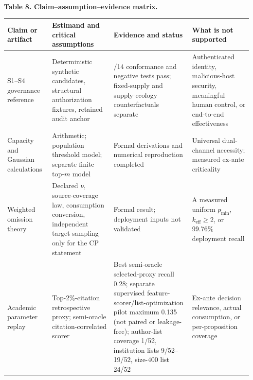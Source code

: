 \documentclass[
  11pt]{article}
\begin{document}
\textbf{Table 8. Claim--assumption--evidence matrix.}

\begin{longtable}[]{@{}
  >{\raggedright\arraybackslash}p{}
  >{\raggedright\arraybackslash}p{}
  >{\raggedright\arraybackslash}p{}
  >{\raggedright\arraybackslash}p{}@{}}
\toprule\noalign{}
\begin{minipage}[b]{\linewidth}\raggedright
Claim or artifact
\end{minipage} & \begin{minipage}[b]{\linewidth}\raggedright
Estimand and critical assumptions
\end{minipage} & \begin{minipage}[b]{\linewidth}\raggedright
Evidence and status
\end{minipage} & \begin{minipage}[b]{\linewidth}\raggedright
What is not supported
\end{minipage} \\
\midrule\noalign{}
\endhead
\bottomrule\noalign{}
\endlastfoot
S1--S4 governance reference & Deterministic synthetic candidates,
structural authorization fixtures, retained audit anchor & 14/14
conformance and negative tests pass; fixed-supply and supply-ecology
counterfactuals separate & Authenticated identity, malicious-host
security, meaningful human control, or end-to-end effectiveness \\
Capacity and Gaussian calculations & Arithmetic; population threshold
model; separate finite top-\(m\) model & Formal derivations and
numerical reproduction completed & Universal dual-channel necessity;
measured ex-ante criticality \\
Weighted omission theory & Declared \(\nu\), source-coverage law,
consumption conversion, independent target sampling only for the CP
statement & Formal result; deployment inputs not validated & A measured
uniform \(p_{\min}\), \(k_{\mathrm{eff}}\ge2\), or 99.76\% deployment
recall \\
Academic parameter replay & Top-2\%-citation retrospective proxy;
semi-oracle citation-correlated scorer & Best semi-oracle selected-proxy
recall 0.28; separate supervised feature-scorer/list-optimization pilot
maximum 0.135 (not paired or leakage-free); author-list coverage 1/52,
institution lists 9/52--19/52, size-400 list 24/52 & Ex-ante decision
relevance, actual consumption, or per-proposition coverage

\end{longtable}
\end{document}
